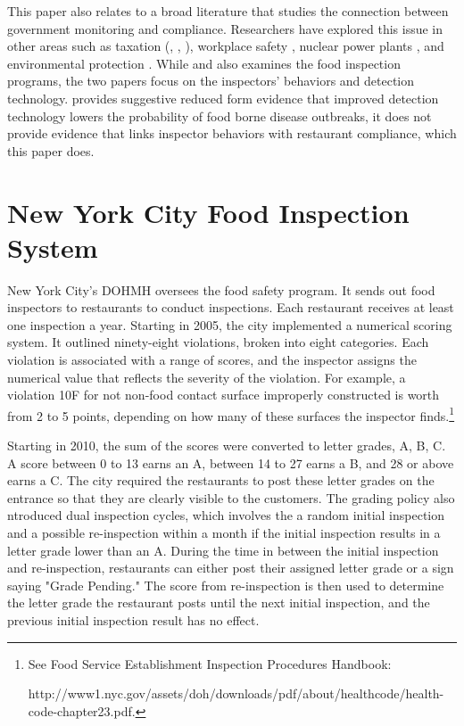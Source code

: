 \documentclass[10pt]{article} %
\begin{document}
This paper also relates to a broad literature that studies the connection between government monitoring and compliance. Researchers have explored this issue in other areas such as taxation (\cite{Feinstein_91}, \cite{Kleven_etal_10}, \cite{Gemmell_Ratto_12}), workplace safety \citep{levine_etal_12}, nuclear power plants \citep{Feinstein_89}, and environmental protection \citep{Duflo_Greenstone_14}. While \cite{Jin_Lee_12} and \cite{Jin_Lee_14} also examines the food inspection programs, the two papers focus on the inspectors' behaviors and detection technology. \cite{Jin_Lee_14} provides suggestive reduced form evidence that improved detection technology lowers the probability of food borne disease outbreaks, it does not provide evidence that links inspector behaviors with restaurant compliance, which this paper does.

\section{New York City Food Inspection System}
\label{background}

New York City's DOHMH oversees the food safety program. It sends out food inspectors to restaurants to conduct inspections. Each restaurant receives at least one inspection a year. Starting in 2005, the city implemented a numerical scoring system. It outlined ninety-eight violations, broken into eight categories. Each violation is associated with a range of scores, and the inspector assigns the numerical value that reflects the severity of the violation. For example, a violation 10F for not non-food contact surface improperly constructed is worth from 2 to 5 points, depending on how many of these surfaces the inspector finds.\footnote{See Food Service Establishment Inspection Procedures Handbook: 

http://www1.nyc.gov/assets/doh/downloads/pdf/about/healthcode/health-code-chapter23.pdf. }

Starting in 2010, the sum of the scores were converted to letter grades, A, B, C. A score between 0 to 13 earns an A, between 14 to 27 earns a B, and 28 or above earns a C. The city required the restaurants to post these letter grades on the entrance so that they are clearly visible to the customers. The grading policy also ntroduced dual inspection cycles, which involves the a random initial inspection and a possible re-inspection within a month if the initial inspection results in a letter grade lower than an A. During the time in between the initial inspection and re-inspection, restaurants can either post their assigned letter grade or a sign saying "Grade Pending." The score from re-inspection is then used to determine the letter grade the restaurant posts until the next initial inspection, and the previous initial inspection result has no effect. 
\end{document}
